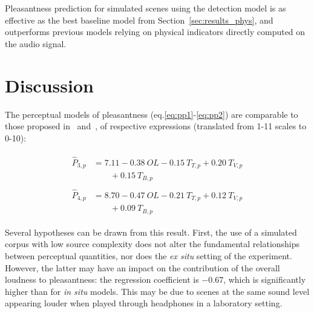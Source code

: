 \documentclass[twocolumn]{article}
\begin{document}
Pleasantness prediction for simulated scenes using the detection model is as effective as the best baseline model from Section~\ref{sec:results_phys}, and outperforms previous models relying on physical indicators directly computed on the audio signal.

\section{Discussion}
\label{sec:discussion}

The perceptual models of pleasantness (eq.\ref{eq:pp1}-\ref{eq:pp2}) are comparable to those proposed in~\cite{ricciardi2014} and~\cite{aumond2017}, of respective expressions (translated from 1-11 scales to 0-10):

\begin{align}
\begin{split}
\hat P_{3, p} {}&= 7.11 - 0.38~OL - 0.15~T_{T, p} + 0.20~T_{V, p} \\
&\qquad + 0.15~T_{B, p}
\end{split}\\
\begin{split}
\hat P_{4, p} {}&= 8.70 - 0.47~OL - 0.21~T_{T, p} + 0.12~T_{V, p} \\
&\qquad + 0.09~T_{B, p}
\end{split}
\end{align}

Several hypotheses can be drawn from this result. First, the use of a simulated corpus with low source complexity does not alter the fundamental relationships between perceptual quantities, nor does the \textit{ex situ} setting of the experiment. However, the latter may have an impact on the contribution of the overall loudness to pleasantness: the regression coefficient is $-0.67$, which is significantly higher than for \textit{in situ} models. This may be due to scenes at the same sound level appearing louder when played through headphones in a laboratory setting.
\end{document}
